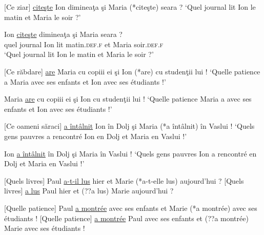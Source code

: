 \ex {} [Ce ziar] \uline{citeşte} Ion dimineaţa şi Maria (*citeşte) {seara ?} \label{ch2:ex24c}
\glt  ‘Quel journal lit Ion le matin et Maria le soir ?’   

\ex  
\gll *[Ce  ziar]  Ion  \uline{citeşte}  dimineaţa  şi  Maria  {seara ?} \label{ch2:ex24d}\\
quel  journal  Ion  lit  matin.\textsc{def.f}  et  Maria  soir.\textsc{def.f}\\
\glt  ‘Quel journal lit Ion le matin et Maria le soir ?’         
\z
\z


\ea
\ea {} [Ce răbdare] \uline{are} Maria cu copiii ei şi Ion (*are) cu studenţii lui ! \label{ch2:ex25a}
\glt ‘Quelle patience a Maria avec ses enfants et Ion avec ses étudiants !’    

\ex *[Ce răbdare] Maria \uline{are} cu copiii ei şi Ion cu studenţii lui ! \label{ch2:ex25b}
\glt  ‘Quelle patience Maria a avec ses enfants et Ion avec ses étudiants !’    

\ex {} [Ce oameni săraci] \uline{a întâlnit} Ion în Dolj şi Maria (*a întâlnit) în {Vaslui !} \label{ch2:ex25c}
\glt  ‘Quels gens pauvres a rencontré Ion en Dolj et Maria en Vaslui !’

 Ion \uline{a întâlnit} în Dolj şi Maria în Vaslui ! \label{ch2:ex25d}
\glt  ‘Quels gens pauvres Ion a rencontré en Dolj et Maria en Vaslui !’
\z
\z


\ea \label{ch2:ex26}
\ea {} [Quels livres] Paul \uline{a-t-il lus} hier et Marie (*a-t-elle lus) aujourd’hui ? 
\ex {} [Quels livres] \uline{a lus} Paul hier et (??a lus) Marie aujourd’hui ?
\z
\z


\ea \label{ch2:ex27}
\ea {} [Quelle patience] Paul \uline{a montrée} avec ses enfants et Marie (*a montrée) avec ses étudiants ! 
\ex {} [Quelle patience] \uline{a montrée} Paul avec ses enfants et (??a montrée) Marie avec ses étudiants ! 
\z
\z

